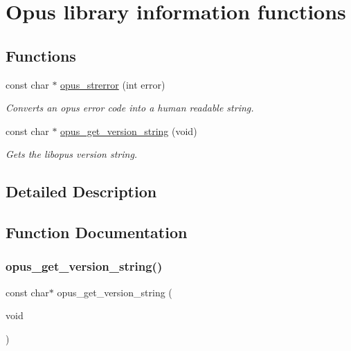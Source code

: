 \hypertarget{group__opus__libinfo}{}\section{Opus library information functions}
\label{group__opus__libinfo}
\subsection*{Functions}
\begin{DoxyCompactItemize}
\item 
const char $\ast$ \hyperlink{group__opus__libinfo_gafad3bac5a05dc7c3477a5765eb5e1873}{opus\+\_\+strerror} (int error)
\begin{DoxyCompactList}\small\item\em Converts an opus error code into a human readable string. \end{DoxyCompactList}\item 
const char $\ast$ \hyperlink{group__opus__libinfo_ga3cd7aa16259a46f37a44d2e823b131e5}{opus\+\_\+get\+\_\+version\+\_\+string} (void)
\begin{DoxyCompactList}\small\item\em Gets the libopus version string. \end{DoxyCompactList}\end{DoxyCompactItemize}


\subsection{Detailed Description}


\subsection{Function Documentation}
\mbox{\label{group__opus__libinfo_ga3cd7aa16259a46f37a44d2e823b131e5}} 
\subsubsection{\texorpdfstring{opus\+\_\+get\+\_\+version\+\_\+string()}{opus\_get\_version\_string()}}
{\footnotesize\ttfamily const char$\ast$ opus\+\_\+get\+\_\+version\+\_\+string (\begin{DoxyParamCaption}\item[{void}]{ }\end{DoxyParamCaption})}



